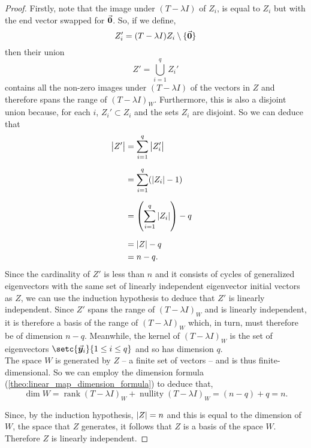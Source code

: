 \documentclass[../MathsNotesBase.tex]{subfiles}
\begin{document}
{\begin{proof}
			Firstly, note that the image under $(T - \lambda I)$ of $Z_i$,
			is equal to $Z_i$ but with the end vector swapped for $\vec{\bm{0}}$. So, if we define,
			\[ Z_i' = (T - \lambda I) Z_i \setminus \{\vec{\bm{0}}\} \]
			then their union
			\[ Z' = \bigcup_{i=1}^q Z_i' \]
			contains all the non-zero images under $(T - \lambda I)$ of the vectors in $Z$ and therefore spans the range of $(T - \lambda I)_W$. Furthermore, this is also a disjoint union because, for each $i$, ${ Z_i' \subset Z_i }$ and the sets $Z_i$ are disjoint. So we can deduce that
			\[\begin{aligned}
				\cardinality{Z'} &= \sum_{i=1}^q \cardinality{Z_i'} \nn
				&= \sum_{i=1}^q (\cardinality{Z_i} - 1) &\sidecomment{} \nn
				&= \left( \sum_{i=1}^q \cardinality{Z_i} \right) - q \nn
				&= \cardinality{Z} - q \\
				&= n - q.
			\end{aligned}\]
			Since the cardinality of $Z'$ is less than $n$ and it consists of cycles of generalized eigenvectors with the same set of linearly independent eigenvector initial vectors as $Z$, we can use the induction hypothesis to deduce that $Z'$ is linearly independent. Since $Z'$ spans the range of $(T - \lambda I)_W$ and is linearly independent, it is therefore a basis of the range of $(T - \lambda I)_W$ which, in turn, must therefore be of dimension ${ n - q }$. Meanwhile, the kernel of $(T - \lambda I)_W$ is the set of eigenvectors ${ \setc{ \y_i }{ 1 \leq i \leq q } }$ and so has dimension $q$.\\
			
			The space $W$ is generated by $Z$ -- a finite set of vectors -- and is thus finite-dimensional. So we can employ the dimension formula (\autoref{theo:linear_map_dimension_formula}) to deduce that,
			\[ \dim W = \operatorname{rank} (T - \lambda I)_W + \operatorname{nullity} (T - \lambda I)_W = (n - q) + q = n. \]
			
			Since, by the induction hypothesis, ${ \left\lvert Z\right\rvert = n }$ and this is equal to the dimension of $W$, the space that $Z$ generates, it follows that $Z$ is a basis of the space $W$. Therefore $Z$ is linearly independent.
		\end{proof}	
		
		
		
		
		
		\biggerskip
}
\end{document}
